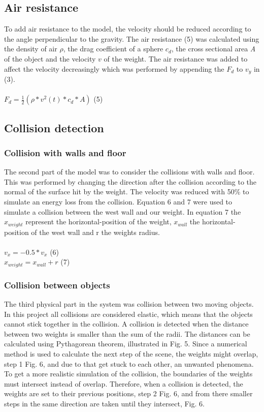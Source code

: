 \documentclass[a4paper,12pt,twoside,english]{article}
\begin{document}
 
\subsection{Air resistance}
To add air resistance to the model, the velocity should be reduced according to the angle perpendicular to the gravity. The air resistance (5) was calculated using the density of air ${\rho}$, the drag coefficient of a sphere $c_d$, the cross sectional area {\itshape A}  of the object and the velocity $v$ of the weight.
The air resistance was added to affect the velocity decreasingly which was performed by appending the $F_d$ to $v_y$ in (3).\\ \\
$F_d = \frac{1}{2}( \rho * v^2(t) * c_{d} * A)$ \hfill (5) 

\subsection{Collision detection}
\subsubsection{Collision with walls and floor}
The second part of the model was to consider the collisions with walls and floor. This was performed by changing the direction after the collision according to the normal of the surface hit by the weight. The velocity was reduced with 50\%  to simulate an energy loss from the collision.  Equation 6 and 7 were used to simulate a collision between the west wall and our weight. In equation 7 the $x_{weight}$ represent the horizontal-position of the weight, $x_{wall}$ the horizontal-position of the west wall and r the weights radius.  \\ \\
$v_x= -0.5*v_x$ \hfill (6) \\
$x_{weight} = x_{wall}+ r$ \hfill (7)

\subsubsection{Collision between objects}
The third physical part in the system was collision between two moving objects. In this project all collisions are considered elastic, which means that the objects cannot stick together in the collision.
A collision is detected when the distance between two weights is smaller than the sum of the radii. The distances can be calculated using Pythagorean theorem, illustrated in Fig. 5. 
Since a numerical method is used to calculate the next step of the scene, the weights might overlap, step 1 Fig. 6, and due to that get stuck to each other, an unwanted phenomena. To get a more realistic simulation of the collision, the boundaries of the weights must intersect instead of overlap. Therefore, when a collision is detected, the weights are set to their previous positions, step 2 Fig. 6, and from there smaller steps in the same direction are taken until they intersect, Fig. 6. 
\end{document}
